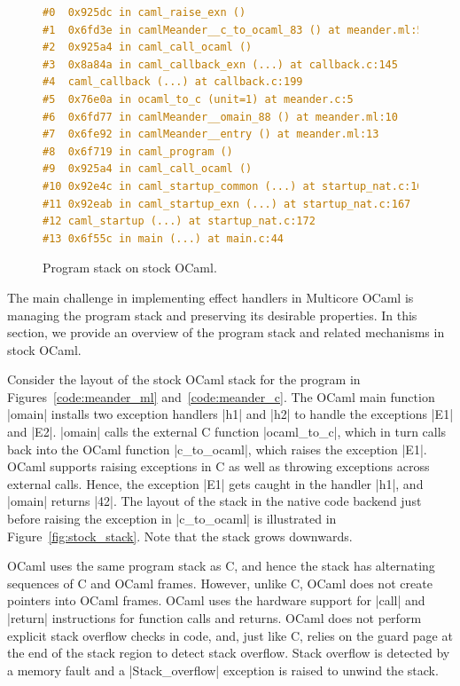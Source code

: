 \documentclass[sigplan,10pt,review,anonymous]{acmart}\settopmatter{printfolios=true,printccs=false,printacmref=false}
\begin{document}
\begin{figure}
\begin{minipage}{0.30\linewidth}
  \label{fig:stock_stack}
\end{minipage}
%
\begin{minipage}{0.39\linewidth}
\begin{lstlisting}[language=c,basicstyle=\ttfamily\footnotesize]
#0  0x925dc in caml_raise_exn ()
#1  0x6fd3e in camlMeander__c_to_ocaml_83 () at meander.ml:5
#2  0x925a4 in caml_call_ocaml ()
#3  0x8a84a in caml_callback_exn (...) at callback.c:145
#4  caml_callback (...) at callback.c:199
#5  0x76e0a in ocaml_to_c (unit=1) at meander.c:5
#6  0x6fd77 in camlMeander__omain_88 () at meander.ml:10
#7  0x6fe92 in camlMeander__entry () at meander.ml:13
#8  0x6f719 in caml_program ()
#9  0x925a4 in caml_call_ocaml ()
#10 0x92e4c in caml_startup_common (...) at startup_nat.c:162
#11 0x92eab in caml_startup_exn (...) at startup_nat.c:167
#12 caml_startup (...) at startup_nat.c:172
#13 0x6f55c in main (...) at main.c:44
\end{lstlisting}
\vspace{-2mm}
\label{code:gdb_backtrace}
\end{minipage}
\vspace{-2mm}
\caption{Program stack on stock OCaml.}
\vspace{-2mm}
\end{figure}

The main challenge in implementing effect handlers in Multicore OCaml is
managing the program stack and preserving its desirable properties. In this
section, we provide an overview of the program stack and related mechanisms in
stock OCaml.

Consider the layout of the stock OCaml stack for the
program in Figures~\ref{code:meander_ml} and~\ref{code:meander_c}. The OCaml
main function |omain| installs two exception handlers |h1| and |h2| to handle
the exceptions |E1| and |E2|. |omain| calls the external C function |ocaml_to_c|,
which in turn calls back into the OCaml function |c_to_ocaml|, which raises the
exception |E1|. OCaml supports raising exceptions in C as well as throwing
exceptions across external calls. Hence, the exception |E1| gets caught in the
handler |h1|, and |omain| returns |42|. The layout of the stack in the native code
backend just before raising the exception in |c_to_ocaml| is illustrated in
Figure~\ref{fig:stock_stack}. Note that the stack grows downwards.

OCaml uses the same program stack as C, and hence the stack has
alternating sequences of C and OCaml frames. However, unlike C, OCaml does not
create pointers into OCaml frames. OCaml uses the hardware support for |call|
and |return| instructions for function calls and returns. OCaml does not
perform explicit stack overflow checks in code, and, just like C, relies on the
guard page at the end of the stack region to detect stack overflow. Stack
overflow is detected by a memory fault and a |Stack_overflow| exception is
raised to unwind the stack.
\end{document}
